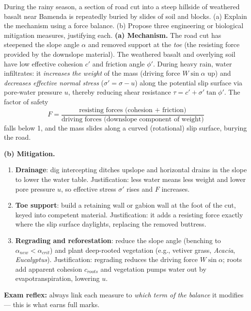 \documentclass[11pt]{article}
\begin{document}
\begin{exoresolu}
During the rainy season, a section of road cut into a steep hillside of weathered basalt near Bamenda is repeatedly buried by slides of soil and blocks. (a) Explain the mechanism using a force balance. (b) Propose three engineering or biological mitigation measures, justifying each.
\tcblower
\textbf{(a) Mechanism.} The road cut has steepened the slope angle $\alpha$ and removed support at the \emph{toe} (the resisting force provided by the downslope material). The weathered basalt and overlying soil have low effective cohesion $c'$ and friction angle $\phi'$. During heavy rain, water infiltrates: it \emph{increases the weight} of the mass (driving force $W\sin\alpha$ up) and \emph{decreases effective normal stress} ($\sigma' = \sigma - u$) along the potential slip surface via pore-water pressure $u$, thereby reducing shear resistance $\tau = c' + \sigma' \tan\phi'$. The factor of safety
\[ F = \frac{\text{resisting forces (cohesion + friction)}}{\text{driving forces (downslope component of weight)}} \]
falls below 1, and the mass slides along a curved (rotational) slip surface, burying the road.

\textbf{(b) Mitigation.}
\begin{enumerate}
\item \textbf{Drainage}: dig intercepting ditches upslope and horizontal drains in the slope to lower the water table. Justification: less water means less weight and lower pore pressure $u$, so effective stress $\sigma'$ rises and $F$ increases.
\item \textbf{Toe support}: build a retaining wall or gabion wall at the foot of the cut, keyed into competent material. Justification: it adds a resisting force exactly where the slip surface daylights, replacing the removed buttress.
\item \textbf{Regrading and reforestation}: reduce the slope angle (benching to $\alpha_{new} < \alpha_{crit}$) and plant deep-rooted vegetation (e.g., vetiver grass, \emph{Acacia}, \emph{Eucalyptus}). Justification: regrading reduces the driving force $W\sin\alpha$; roots add apparent cohesion $c_{roots}$ and vegetation pumps water out by evapotranspiration, lowering $u$.
\end{enumerate}
\textbf{Exam reflex:} always link each measure to \emph{which term of the balance} it modifies — this is what earns full marks.
\end{exoresolu}
\end{document}
